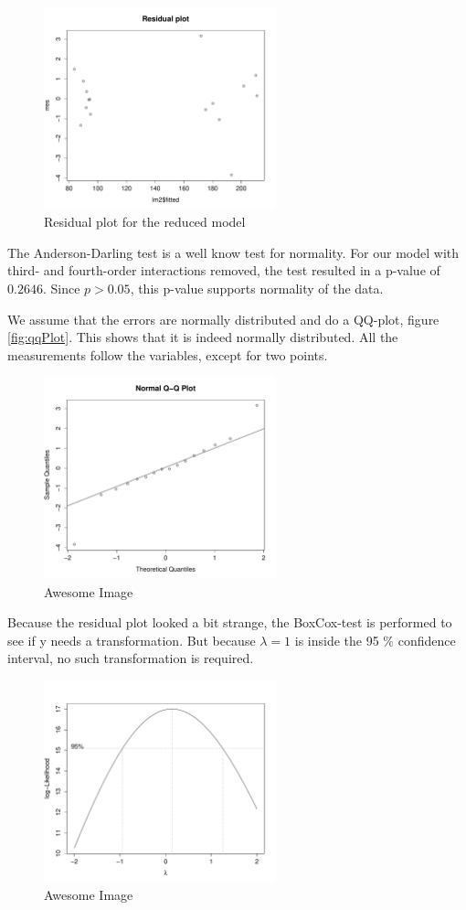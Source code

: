 \begin{figure}[H]
    \centering
    \includegraphics[width=0.6\textwidth]{PDF/residualPlot.pdf}
    \caption{Residual plot for the reduced model}
    \label{fig:residual}
\end{figure}

The Anderson-Darling test is a well know test for normality. For our model with third- and fourth-order interactions removed, the test resulted in a p-value of $0.2646$. Since $p > 0.05$, this p-value supports normality of the data.

We assume that the errors are normally distributed and do a QQ-plot, figure \ref{fig:qqPlot}. This shows that it is indeed normally distributed. All the measurements follow the variables, except for two points.

\begin{figure}[H]
    \centering
    \includegraphics[width=0.6\textwidth]{PDF/qqPlot.pdf}
    \caption{Awesome Image}
    \label{fig:awesome_image}
\end{figure}

Because the residual plot looked a bit strange, the BoxCox-test is performed to see if y needs a transformation. But because $\lambda = 1$ is inside the 95 $\%$ confidence interval, no such transformation is required. 

\begin{figure}[H]
    \centering
    \includegraphics[width=0.6\textwidth]{PDF/boxCox.pdf}
    \caption{Awesome Image}
    \label{fig:boxCox}
\end{figure}



